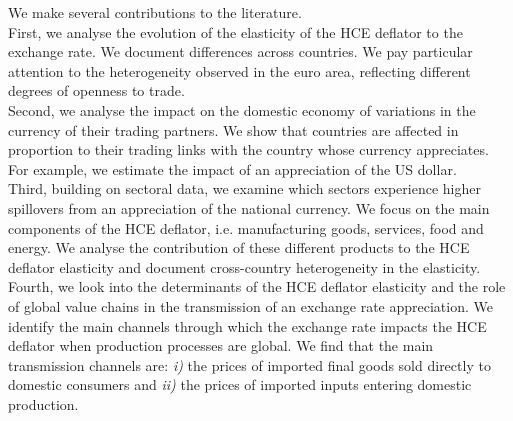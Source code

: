 \documentclass[11pt,a4paper]{paper} %
\begin{document}
We make several contributions to the literature.\\
First, we analyse the evolution of the elasticity of the HCE deflator to the exchange rate. 
We document differences across countries.
We pay particular attention to the heterogeneity observed in the euro area, reflecting different degrees of openness to trade.\\
Second, we analyse the impact on the domestic economy of variations in the currency of their trading partners. 
We show that countries are affected in proportion to their trading links with the country whose currency appreciates. 
For example, we estimate the impact of an appreciation of the US dollar.\\
Third, building on sectoral data, we examine which sectors experience higher spillovers from an appreciation of the national currency. 
We focus on the main components of the HCE deflator, i.e. manufacturing goods, services, food and energy. 
We analyse the contribution of these different products to the HCE deflator elasticity and document cross-country heterogeneity in the elasticity.\\
Fourth, we look into the determinants of the HCE deflator elasticity and the role of global value chains in the transmission of an exchange rate appreciation. 
We identify the main channels through which the exchange rate impacts the HCE deflator when production processes are global.
We find that the main transmission channels are:
\textit{i)} the prices of imported ﬁnal goods sold directly to domestic consumers and
\textit{ii)} the prices of imported inputs entering domestic production. 
\end{document}
